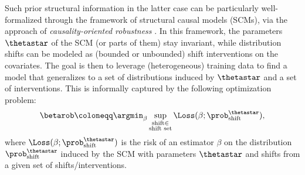 

Such prior structural information in the latter case can be particularly well-formalized through the framework of structural causal models (SCMs), via the approach of  \emph{causality-oriented robustness} \citep{meinshausen2018causality, buhlmann2020invariance}.
In this framework, the parameters  $\thetastar$ of the SCM (or parts of them) stay invariant, while distribution shifts can be modeled as (bounded or unbounded) shift interventions on the covariates. 
The goal is then to leverage (heterogeneous) training data to find a model that generalizes to a set of distributions induced by $\thetastar$ and a set of interventions. 
This is informally captured by the
following optimization problem:
\begin{equation}\label{eq:conventional-robust-risk}
   \betarob \coloneqq \argmin_{\beta} \sup_{\substack{\text{shift} \in \\ \text{shift set}}} \Loss (\beta; \prob^{\thetastar}_{\text{shift}}),
\end{equation}
where $\Loss(\beta; \prob^{\thetastar}_{\text{shift}})$ is the risk of an estimator $\beta$ on the distribution $\prob^{\thetastar}_{\text{shift}}$
induced by the SCM with parameters $\thetastar$ and shifts from a given set of shifts/interventions.
